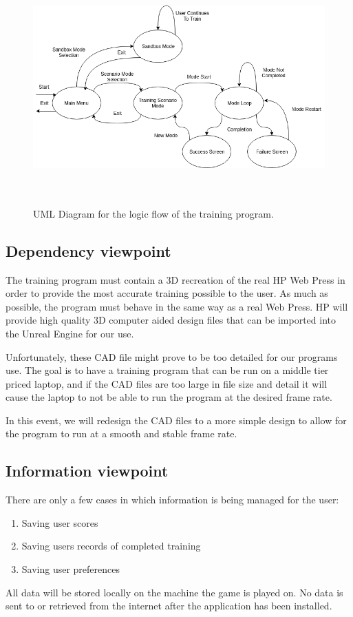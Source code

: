 \documentclass[onecolumn, draftclsnofoot,10pt, compsoc]{IEEEtran}
\begin{document}
\begin{center}
    \begin{figure}[h]
        \centering
        \includegraphics[width=15cm, height=9cm]{logical_view1.png}
        \caption{UML Diagram for the logic flow of the training program.}
        \label{fig:logic_uml}
    \end{figure}
\end{center}

\subsection{Dependency viewpoint}
The training program must contain a 3D recreation of the real HP Web Press in order to provide the most accurate training possible to the user. As much as possible, the program must behave in the same way as a real Web Press. HP will provide high quality 3D computer aided design files that can be imported into the Unreal Engine for our use.

Unfortunately, these CAD file might prove to be too detailed for our programs use. The goal is to have a training program that can be run on a middle tier priced laptop, and if the CAD files are too large in file size and detail it will cause the laptop to not be able to run the program at the desired frame rate.

In this event, we will redesign the CAD files to a more simple design to allow for the program to run at a smooth and stable frame rate.
\subsection{Information viewpoint}
There are only a few cases in which information is being managed for the user:
\begin{enumerate}
    \item Saving user scores
    \item Saving users records of completed training
    \item Saving user preferences
\end{enumerate}
All data will be stored locally on the machine the game is played on. No data is sent to or retrieved from the internet after the application has been installed. 
\end{document}
